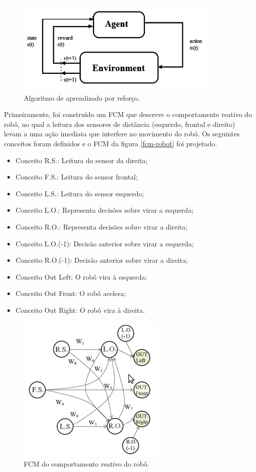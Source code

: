 \begin{figure}[!htb]
    \centering
    \includegraphics{./figs/reinforcement.png}
    \caption[Mapa Cognitivo Fuzzy]{Algoritmo de aprendizado por reforço.}
    \label{fig:reinforcement-alg}
\end{figure}

Primeiramente, foi construído um FCM que descreve o comportamente reativo do robô, no qual a leitura dos sensores de distância (esquerdo, frontal e direito) levam a uma ação imediata que interfere no movimento do robô. Os seguintes conceitos foram definidos e o FCM da figura \ref{fcm-robot} foi projetado.

\begin{itemize}
\item Conceito R.S.: Leitura do sensor da direita;
\item Conceito F.S.: Leitura do sensor frontal;
\item Conceito L.S.: Leitura do sensor esquerdo;
\item Conceito L.O.: Representa decisões sobre virar a esquerda;
\item Conceito R.O.: Representa decisões sobre virar a direita;
\item Conceito L.O.(-1): Decisão anterior sobre virar a esquerda;
\item Conceito R.O.(-1): Decisão anterior sobre virar a direita;
\item Conceito Out Left: O robô vira à esquerda;
\item Conceito Out Front: O robô acelera;
\item Conceito Out Right: O robô vira à direita.
\end{itemize}

\begin{figure}[!htb]
    \centering
    \includegraphics{./figs/fcm-robot.png}
    \caption[Mapa Cognitivo Fuzzy]{FCM do comportamento reativo do robô.}
    \label{fig:fcm-robot}
\end{figure}

